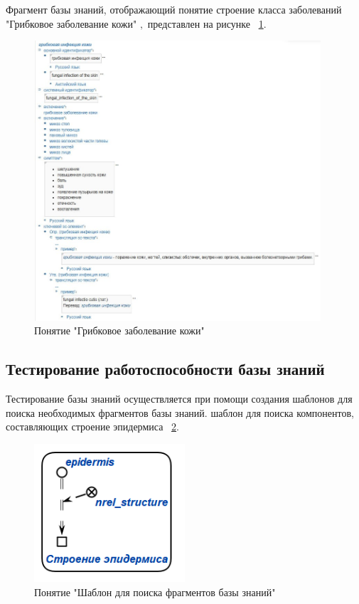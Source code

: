 Фрагмент базы знаний, отображающий  понятие строение класса заболеваний "Грибковое заболевание кожи" \cite{bme}$,$ представлен на рисунке
~\ref{fig:sections/fungal_infection_of_skin}.
\begin{figure}[H]
	\centering
	\includegraphics[width=0.95\textwidth]{sections/fungal_infection_of_skin.png}
	\caption{Понятие "Грибковое заболевание кожи"}
	\label{fig:sections/fungal_infection_of_skin}
\end{figure}

\subsection{Тестирование работоспособности базы знаний}
Тестирование базы знаний осуществляется при помощи создания шаблонов для поиска необходимых фрагментов базы знаний.
шаблон для поиска компонентов, составляющих строение эпидермиса
~\ref{fig:sections/pattern_2_der}.
\begin{figure}[H]
	\centering
	\includegraphics[width=0.5\textwidth]{sections/pattern_2_der.png}
	\caption{Понятие "Шаблон для поиска фрагментов базы знаний"}
	\label{fig:sections/pattern_2_der}
\end{figure}

